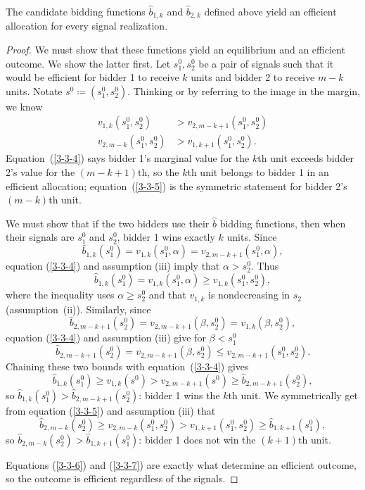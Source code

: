 \begin{proposition}
	The candidate bidding functions $\hat{b}_{1,k}$ and $\hat{b}_{2,k}$ defined above yield an efficient allocation for every signal realization.
\end{proposition}
\begin{proof}
	We must show that these functions yield an equilibrium and an efficient outcome. We show the latter first.
	Let $s_1^0, s_2^0$ be a pair of signals such that it would be efficient for bidder 1 to receive $k$ units and bidder 2 to receive $m-k$ units. Notate $s^0 \coloneqq \left( s_1^0, s_2^0 \right)$. Thinking  or by referring to the image in the margin, we know
	\begin{align}
		v_{1,k}(s_1^0,s_2^0) &> v_{2,m-k+1}(s_1^0,s_2^0) \label{3-3-4}\\
		v_{2,m-k}(s_1^0,s_2^0) &> v_{1,k+1}(s_1^0, s_2^0) \label{3-3-5}
	.\end{align}
	Equation~(\ref{3-3-4}) says bidder 1's marginal value for the $k$th unit exceeds bidder 2's value for the $(m-k+1)$th, so the $k$th unit belongs to bidder 1 in an efficient allocation; equation~(\ref{3-3-5}) is the symmetric statement for bidder 2's $(m-k)$th unit.

	We must show that if the two bidders use their $\hat{b}$ bidding functions, then when their signals are $s_1^0$ and $s_2^0$, bidder 1 wins exactly $k$ units.
Since
\[
	\hat{b}_{1,k}(s_1^0) = v_{1,k}(s_1^0, \alpha) = v_{2,m-k+1}(s_1^0,\alpha),
\]
equation (\ref{3-3-4}) and assumption (iii) imply that $\alpha > s_2^0$.
Thus
\[
		\hat{b}_{1,k}(s_1^0) = v_{1,k}(s_1^0,\alpha) \ge v_{1,k}(s_1^0, s_2^0)
	,\] where the inequality uses $\alpha \ge s_2^0$ and that $v_{1,k}$ is nondecreasing in $s_2$ (assumption~(ii)).
	Similarly, since \[\hat{b}_{2,m-k+1}(s_2^0) = v_{2,m-k+1}(\beta,s_2^0) = v_{1,k}(\beta,s_2^0),\]
	equation (\ref{3-3-4}) and assumption (iii) give for $\beta < s_1^0$
	\begin{equation} \label{3-3-6}
		\hat{b}_{2,m-k+1}(s_2^0) = v_{2,m-k+1}(\beta,s_2^0) \le v_{2,m-k+1}(s_1^0,s_2^0)
	.\end{equation}
	Chaining these two bounds with equation~(\ref{3-3-4}) gives \[\hat{b}_{1,k}(s_1^0) \ge v_{1,k}(s^0) > v_{2,m-k+1}(s^0) \ge \hat{b}_{2,m-k+1}(s_2^0),\]
	so $\hat{b}_{1,k}(s_1^0) > \hat{b}_{2,m-k+1}(s_2^0)$: bidder 1 wins the $k$th unit.
	We symmetrically get from equation (\ref{3-3-5}) and assumption (iii) that
	\begin{equation} \label{3-3-7}
		\hat{b}_{2,m-k}(s_2^0) \ge v_{2,m-k}(s_1^0,s_2^0) > v_{1,k+1}(s_1^0,s_2^0) \ge \hat{b}_{1,k+1}(s_1^0),
	\end{equation}
	so $\hat{b}_{2,m-k}(s_2^0) > \hat{b}_{1,k+1}(s_1^0)$: bidder 1 does not win the $(k+1)$th unit.

	Equations (\ref{3-3-6}) and (\ref{3-3-7}) are exactly what determine an efficient outcome, so the outcome is efficient regardless of the signals.
\end{proof}

